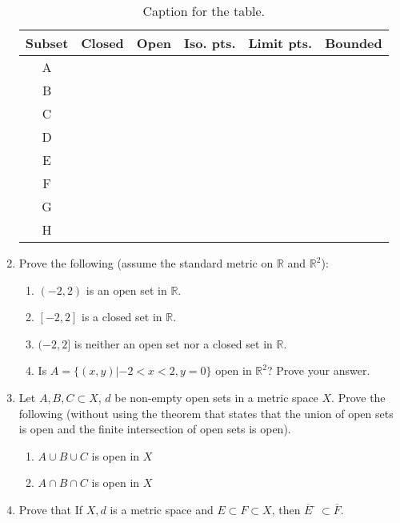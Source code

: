 \documentclass[12pt]{amsart}
\newcommand{\benu}{\begin{enumerate}}
\newcommand{\eenu}{\end{enumerate}}
\theoremstyle{definition}
\newcommand{\mbR}{\mathbb{R}}
\begin{document}
\begin{enumerate}[series=p]
	\begin{table}[h!]
		\centering
		\caption{Caption for the table.}
		\label{tab:table1}
		\begin{tabular}{c|c|c|c|c|c}
			Subset & Closed & Open & Iso. pts. & Limit pts. & Bounded\\
			\toprule
			    A & &  &  & &\\ \hline
			    B & &  &  & &\\ \hline
			    C & &  &  & &\\ \hline
			    D & &  &  & &\\ \hline
			    E & &  &  & &\\ \hline
			    F & &  &  & &\\ \hline
			    G & &  &  & &\\ \hline
			    H & &  &  & &\\
			
		\end{tabular}
	\end{table}

\newpage

\item Prove the following (assume the standard metric on $\mbR$ and $\mbR^2$):
	\benu
		\item $(-2,2)$ is an open set in $\mbR$.
		\item $[-2,2]$ is a closed set in $\mbR$.
		\item $(-2,2]$ is neither an open set nor a closed set in $\mbR$.
		\item Is $A = \{(x, y)| -2 < x < 2, y = 0\}$ open in $\mbR^2$? Prove your answer.
	\eenu

\newpage

\item Let $A,B, C \subset X$, $d$ be non-empty open sets in a metric space $X$. Prove the
following (without using the theorem that states that the union of open sets is open and the finite intersection of open sets is open).
	\benu
		\item $A \cup B \cup C$ is open in $X$
		\item $A \cap B \cap C$ is open in $X$
	\eenu
\newpage


\item Prove that If $X, d$ is a metric space and $E \subset F \subset X$, then $\overline{E}̅ \subset \overline{F}$.


\newpage

\end{enumerate}
\end{document}
